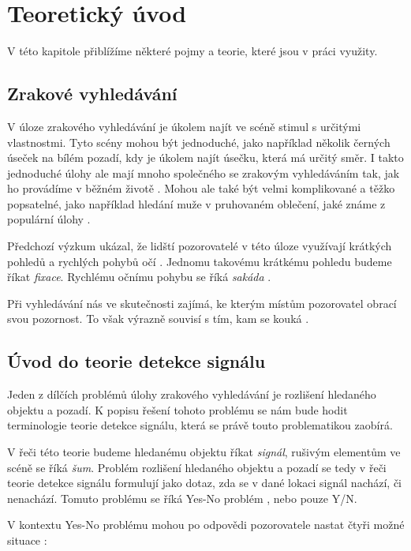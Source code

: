 \chapter{Teoretický úvod}

V této kapitole přiblížíme některé pojmy a teorie, které jsou v práci využity.

\section{Zrakové vyhledávání}

V úloze zrakového vyhledávání je úkolem najít ve scéně stimul s určitými
vlastnostmi. Tyto scény mohou být jednoduché, jako například několik černých
úseček na bílém pozadí, kdy je úkolem najít úsečku, která má určitý směr. I
takto jednoduché úlohy ale mají mnoho společného se zrakovým vyhledáváním tak,
jak ho provádíme v běžném životě \citep{VisualSearch}. Mohou ale také být velmi
komplikované a těžko popsatelné, jako například hledání muže v pruhovaném
oblečení, jaké známe z populární úlohy .  

Předchozí výzkum ukázal, že lidští
pozorovatelé v této úloze využívají krátkých pohledů a rychlých pohybů očí \citep{Holmquist}.
Jednomu takovému krátkému pohledu budeme říkat \emph{fixace}. Rychlému očnímu pohybu
se říká \emph{sakáda} \citep{sakady}.

Při vyhledávání nás ve skutečnosti zajímá, ke kterým místům pozorovatel obrací
svou pozornost. To však výrazně souvisí s tím, kam se kouká \citep{Attention}.


\section{Úvod do teorie detekce signálu}

Jeden z dílčích problémů úlohy zrakového vyhledávání je rozlišení hledaného
objektu a pozadí. K popisu řešení tohoto problému se nám bude hodit
terminologie teorie detekce signálu, která se právě touto problematikou
zaobírá.

V řeči této teorie budeme hledanému objektu říkat {\it signál},
rušivým elementům ve scéně se říká {\it šum}. Problém rozlišení hledaného
objektu a pozadí se tedy v řeči teorie detekce signálu formulují jako dotaz,
zda se v dané lokaci signál nachází, či nenachází. Tomuto problému se říká Yes-No
problém \citep{NeilSDT}, nebo pouze Y/N.

V kontextu Yes-No problému mohou po odpovědi pozorovatele nastat čtyři možné situace \citep{GreenSDT}:

